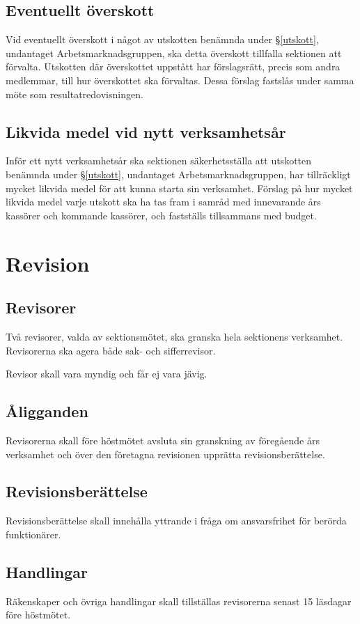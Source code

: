 \documentclass{datateknologsektionen-document}
\begin{document}
\subsection{Eventuellt överskott}
Vid eventuellt överskott i något av utskotten benämnda under \S \ref{utskott}, undantaget
Arbetsmarknadsgruppen, ska detta överskott tillfalla sektionen att förvalta. Utskotten
där överskottet uppstått har förslagsrätt, precis som andra medlemmar, till hur
överskottet ska förvaltas. Dessa förslag fastslås under samma möte som
resultatredovisningen.
\subsection{Likvida medel vid nytt verksamhetsår}
Inför ett nytt verksamhetsår ska sektionen säkerhetsställa att utskotten benämnda
under \S \ref{utskott}, undantaget Arbetsmarknadsgruppen, har tillräckligt mycket likvida medel för
att kunna starta sin verksamhet. Förslag på hur mycket likvida medel varje utskott ska
ha tas fram i samråd med innevarande års kassörer och kommande kassörer, och
fastställs tillsammans med budget.


\section{Revision}
\subsection{Revisorer}
Två revisorer, valda av sektionsmötet, ska granska hela sektionens verksamhet.
Revisorerna ska agera både sak- och sifferrevisor.

Revisor skall vara myndig och får ej vara jävig.
\subsection{Åligganden}
Revisorerna skall före höstmötet avsluta sin granskning av föregående års verksamhet
och över den företagna revisionen upprätta revisionsberättelse.
\subsection{Revisionsberättelse}
Revisionsberättelse skall innehålla yttrande i fråga om ansvarsfrihet för berörda
funktionärer.
\subsection{Handlingar}
Räkenskaper och övriga handlingar skall tillställas revisorerna senast 15 läsdagar före
höstmötet.
\end{document}
